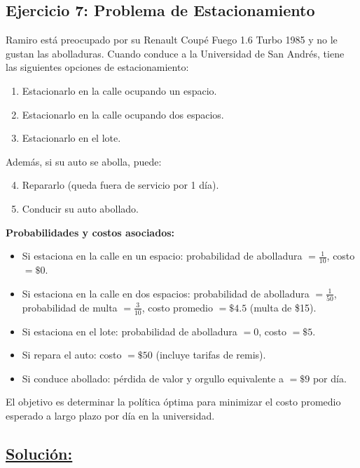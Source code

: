 \documentclass[a4paper,11pt]{article}
\begin{document}
\subsection{Ejercicio 7: Problema de Estacionamiento}

Ramiro está preocupado por su Renault Coupé Fuego 1.6 Turbo 1985 y no le gustan las abolladuras. Cuando conduce a la Universidad de San Andrés, tiene las siguientes opciones de estacionamiento:

\begin{enumerate}
    \item Estacionarlo en la calle ocupando un espacio.
    \item Estacionarlo en la calle ocupando dos espacios.
    \item Estacionarlo en el lote.
\end{enumerate}

Además, si su auto se abolla, puede:

\begin{enumerate}
    \setcounter{enumi}{3}
    \item Repararlo (queda fuera de servicio por 1 día).
    \item Conducir su auto abollado.
\end{enumerate}

\textbf{Probabilidades y costos asociados:}

\begin{itemize}
    \item Si estaciona en la calle en un espacio: probabilidad de abolladura $= \frac{1}{10}$, costo $= \$0$.
    \item Si estaciona en la calle en dos espacios: probabilidad de abolladura $= \frac{1}{50}$, probabilidad de multa $= \frac{3}{10}$, costo promedio $= \$4.5$ (multa de \$15).
    \item Si estaciona en el lote: probabilidad de abolladura $= 0$, costo $= \$5$.
    \item Si repara el auto: costo $= \$50$ (incluye tarifas de remis).
    \item Si conduce abollado: pérdida de valor y orgullo equivalente a $= \$9$ por día.
\end{itemize}

El objetivo es determinar la política óptima para minimizar el costo promedio esperado a largo plazo por día en la universidad.

\subsection*{\underline{Solución:}}
\end{document}

